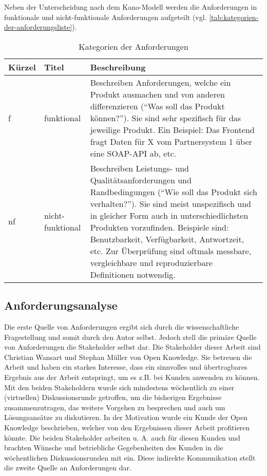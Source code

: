 Neben der Unterscheidung nach dem Kano-Modell werden die Anforderungen in funktionale und nicht-funktionale Anforderungen \cite{FunktionaleUndNichtFunktionaleAnforderungen} aufgeteilt (vgl. \autoref{tab:kategorien-der-anforderungsliste}).

\begin{table}[H]
\begin{tabular}{ |p{1.15cm}|p{2.75cm}|p{9.6cm}| }
	\hline
	Kürzel & Titel & Beschreibung \\
	\hline
	f & funktional & Beschreiben Anforderungen, welche ein Produkt ausmachen und von anderen differenzieren (\enquote{Was soll das Produkt können?}). Sie sind sehr spezifisch für das jeweilige Produkt. Ein Beispiel: Das Frontend fragt Daten für X vom Partnersystem 1 über eine SOAP-API ab, etc.\\
	\hline
	nf & nicht-funktional & Beschreiben Leistungs- und Qualitätsanforderungen und Randbedingungen (\enquote{Wie soll das Produkt sich verhalten?}). Sie sind meist unspezifisch und in gleicher Form auch in unterschiedlichsten Produkten vorzufinden. Beispiele sind: Benutzbarkeit, Verfügbarkeit, Antwortzeit, etc. Zur Überprüfung sind oftmals messbare, vergleichbare und reproduzierbare Definitionen notwendig. \\
	\hline
\end{tabular}
 \captionsetup{justification=centering}
  \caption{Kategorien der Anforderungen}
   \label{tab:kategorien-der-anforderungsliste}
\end{table}
	
\subsection{Anforderungsanalyse}

Die erste Quelle von Anforderungen ergibt sich durch die wissenschaftliche Fragestellung und somit durch den Autor selbst. Jedoch stell die primäre Quelle von Anforderungen die Stakeholder selbst dar. Die Stakeholder dieser Arbeit sind Christian Wansart und Stephan Müller von Open Knowledge. Sie betreuen die Arbeit und haben ein starkes Interesse, dass ein sinnvolles und übertragbares Ergebnis aus der Arbeit entspringt, um es z.B. bei Kunden anwenden zu können. Mit den beiden Stakeholdern wurde sich mindestens wöchentlich zu einer (virtuellen) Diskussionsrunde getroffen, um die bisherigen Ergebnisse zusammenzutragen, das weitere Vorgehen zu besprechen und auch um Lösungsansätze zu diskutieren. In der Motivation wurde ein Kunde der Open Knowledge beschrieben, welcher von den Ergebnissen dieser Arbeit profitieren könnte. Die beiden Stakeholder arbeiten u. A. auch für diesen Kunden und brachten Wünsche und betriebliche Gegebenheiten des Kunden in die wöchentlichen Diskussionsrunden mit ein. Diese indirekte Kommunikation stellt die zweite Quelle an Anforderungen dar.

